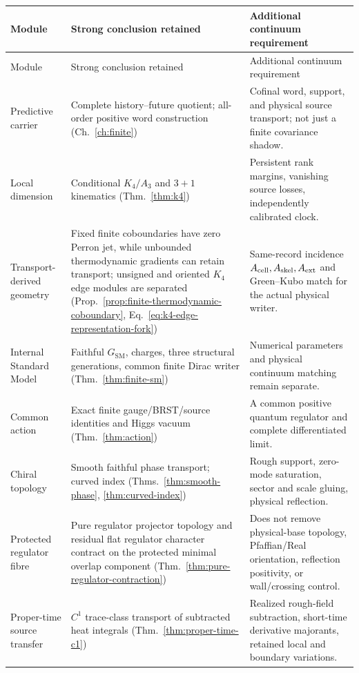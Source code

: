 \documentclass[11pt,a4paper,oneside]{book}
\theoremstyle{plain}
\theoremstyle{definition}
\theoremstyle{remark}
\newcommand{\GSM}{G_{\mathrm{SM}}}
\begin{document}
\footnotesize
\begin{longtable}{@{}>{\raggedright\arraybackslash}p{}>{\raggedright\arraybackslash}p{}>{\raggedright\arraybackslash}p{}@{}}
\toprule
Module & Strong conclusion retained & Additional continuum requirement\\
\midrule
\endfirsthead
\toprule
Module & Strong conclusion retained & Additional continuum requirement\\
\midrule
\endhead
\bottomrule
\endfoot
Predictive carrier & Complete history--future quotient; all-order positive word construction (Ch.~\ref{ch:finite}) & Cofinal word, support, and physical source transport; not just a finite covariance shadow.\\[1pt]
Local dimension & Conditional $K_4/A_3$ and $3+1$ kinematics (Thm.~\ref{thm:k4}) & Persistent rank margins, vanishing source losses, independently calibrated clock.\\[1pt]
Transport-derived geometry & Fixed finite coboundaries have zero Perron jet, while unbounded thermodynamic gradients can retain transport; unsigned and oriented $K_4$ edge modules are separated (Prop.~\ref{prop:finite-thermodynamic-coboundary}, Eq.~\eqref{eq:k4-edge-representation-fork}) & Same-record incidence $A_{\rm cell},A_{\rm skel},A_{\rm ext}$ and Green--Kubo match for the actual physical writer.\\[1pt]
Internal Standard Model & Faithful $\GSM$, charges, three structural generations, common finite Dirac writer (Thm.~\ref{thm:finite-sm}) & Numerical parameters and physical continuum matching remain separate.\\[1pt]
Common action & Exact finite gauge/BRST/source identities and Higgs vacuum (Thm.~\ref{thm:action}) & A common positive quantum regulator and complete differentiated limit.\\[1pt]
Chiral topology & Smooth faithful phase transport; curved index (Thms.~\ref{thm:smooth-phase}, \ref{thm:curved-index}) & Rough support, zero-mode saturation, sector and scale gluing, physical reflection.\\[1pt]
Protected regulator fibre & Pure regulator projector topology and residual flat regulator character contract on the protected minimal overlap component (Thm.~\ref{thm:pure-regulator-contraction}) & Does not remove physical-base topology, Pfaffian/Real orientation, reflection positivity, or wall/crossing control.\\[1pt]
Proper-time source transfer & $C^1$ trace-class transport of subtracted heat integrals (Thm.~\ref{thm:proper-time-c1}) & Realized rough-field subtraction, short-time derivative majorants, retained local and boundary variations.\\[1pt]

\end{longtable}
\end{document}
